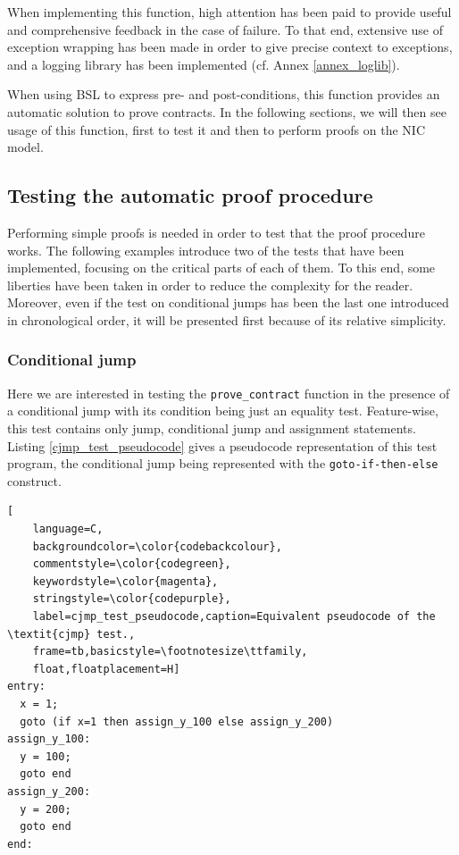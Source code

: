 \documentclass{kththesis}
\begin{document}

When implementing this function, high attention has been paid to provide useful and comprehensive feedback in the case of failure. To that end, extensive use of exception wrapping has been made in order to give precise context to exceptions, and a logging library has been implemented (cf. Annex \ref{annex_loglib}).

When using \gls{BSL} to express pre- and post-conditions, this function provides an automatic solution to prove contracts. In the following sections, we will then see usage of this function, first to test it and then to perform proofs on the NIC model.

\subsection{Testing the automatic proof procedure}

Performing simple proofs is needed in order to test that the proof procedure works. The following examples introduce two of the tests that have been implemented, focusing on the critical parts of each of them. To this end, some liberties have been taken in order to reduce the complexity for the reader. Moreover, even if the test on conditional jumps has been the last one introduced in chronological order\footnotemark, it will be presented first because of its relative simplicity.


\subsubsection{Conditional jump} \label{cjmp_test}

Here we are interested in testing the \texttt{prove\_contract} function in the presence of a conditional jump with its condition being just an equality test. Feature-wise, this test contains only jump, conditional jump and assignment statements. Listing \ref{cjmp_test_pseudocode} gives a pseudocode representation of this test program, the conditional jump being represented with the \texttt{goto-if-then-else} construct.

\begin{lstlisting}[
    language=C,
    backgroundcolor=\color{codebackcolour},
    commentstyle=\color{codegreen},
    keywordstyle=\color{magenta},
    stringstyle=\color{codepurple},
    label=cjmp_test_pseudocode,caption=Equivalent pseudocode of the \textit{cjmp} test.,
    frame=tb,basicstyle=\footnotesize\ttfamily,
    float,floatplacement=H]
entry:
  x = 1;
  goto (if x=1 then assign_y_100 else assign_y_200)
assign_y_100:
  y = 100;
  goto end
assign_y_200:
  y = 200;
  goto end
end:
\end{lstlisting}
\end{document}
